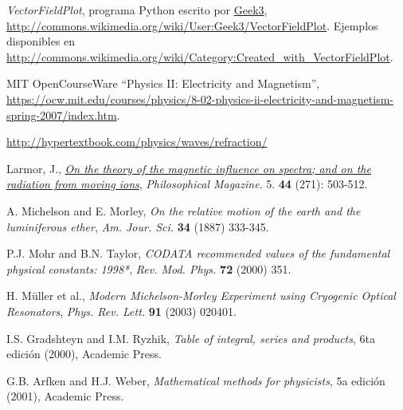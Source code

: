 \begin{thebibliography}{99}
 \textit{VectorFieldPlot}, programa Python escrito por \href{http://commons.wikimedia.org/wiki/User:Geek3}{Geek3}, \url{http://commons.wikimedia.org/wiki/User:Geek3/VectorFieldPlot}. Ejemplos disponibles en \url{http://commons.wikimedia.org/wiki/Category:Created_with_VectorFieldPlot}.


 MIT OpenCourseWare  ``Physics II: Electricity and Magnetism'', \url{https://ocw.mit.edu/courses/physics/8-02-physics-ii-electricity-and-magnetism-spring-2007/index.htm}.

\url{http://hypertextbook.com/physics/waves/refraction/}

 Larmor, J., \href{doi.org/10.1080/14786449708621095}{\textit{On the theory of the magnetic influence on spectra; and on the radiation from moving ions}}, \textsl{Philosophical Magazine}. 5. \textbf{44} (271): 503-512.

 A. Michelson and E. Morley, {\it On the relative motion of the earth and the luminiferous ether}, {\sl Am. Jour. Sci.} {\bf 34} (1887) 333-345.

 P.J. Mohr and B.N. Taylor, {\it CODATA recommended values of the fundamental physical constants: 1998*}, {\sl Rev. Mod. Phys.} {\bf 72}
(2000) 351.

 H. M\"uller et al., {\it Modern Michelson-Morley
Experiment using Cryogenic Optical Resonators}, {\sl Phys. Rev. Lett.} {\bf 91} (2003) 020401.

 I.S. Gradshteyn and I.M. Ryzhik, {\it Table of integral, series and products}, 6ta edición (2000), Academic Press.

 G.B. Arfken and H.J. Weber, {\it Mathematical methods for physicists}, 5a  edición (2001), Academic Press.




\end{thebibliography}

